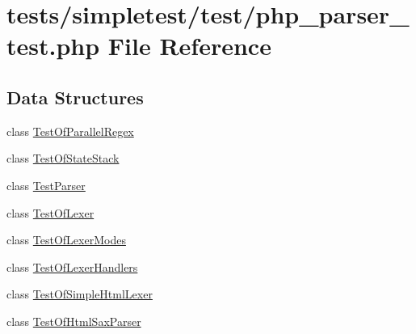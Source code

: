 \hypertarget{php__parser__test_8php}{\section{tests/simpletest/test/php\-\_\-parser\-\_\-test.php File Reference}
\label{php__parser__test_8php}
}
\subsection*{Data Structures}
\begin{DoxyCompactItemize}
\item 
class \hyperlink{class_test_of_parallel_regex}{Test\-Of\-Parallel\-Regex}
\item 
class \hyperlink{class_test_of_state_stack}{Test\-Of\-State\-Stack}
\item 
class \hyperlink{class_test_parser}{Test\-Parser}
\item 
class \hyperlink{class_test_of_lexer}{Test\-Of\-Lexer}
\item 
class \hyperlink{class_test_of_lexer_modes}{Test\-Of\-Lexer\-Modes}
\item 
class \hyperlink{class_test_of_lexer_handlers}{Test\-Of\-Lexer\-Handlers}
\item 
class \hyperlink{class_test_of_simple_html_lexer}{Test\-Of\-Simple\-Html\-Lexer}
\item 
class \hyperlink{class_test_of_html_sax_parser}{Test\-Of\-Html\-Sax\-Parser}
\end{DoxyCompactItemize}
